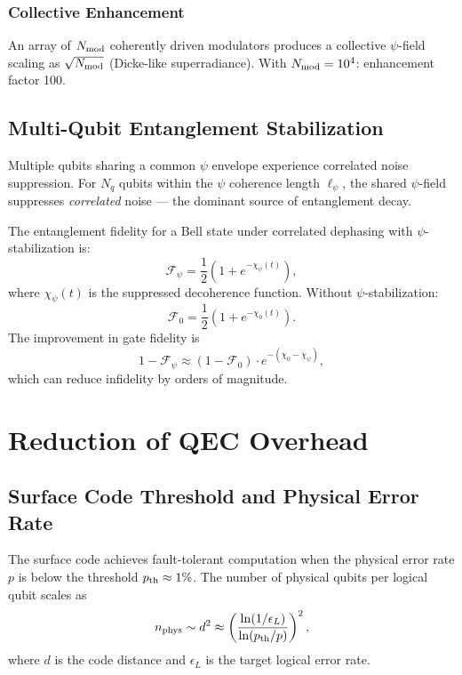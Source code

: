 \documentclass[aps,prd,twocolumn,superscriptaddress,nofootinbib]{revtex4-2}
\begin{document}
\subsubsection{Collective Enhancement}
An array of $N_{\rm mod}$ coherently driven modulators produces a
collective $\psi$-field scaling as $\sqrt{N_{\rm mod}}$ (Dicke-like
superradiance). With $N_{\rm mod} = 10^4$: enhancement factor 100.

\subsection{Multi-Qubit Entanglement Stabilization}

Multiple qubits sharing a common $\psi$ envelope experience correlated
noise suppression. For $N_q$ qubits within the $\psi$ coherence length
$\ell_\psi$, the shared $\psi$-field suppresses \emph{correlated} noise
--- the dominant source of entanglement decay.

The entanglement fidelity for a Bell state under correlated dephasing
with $\psi$-stabilization is:
\begin{equation}
\mathcal{F}_\psi = \frac{1}{2}\!\left(1 + e^{-\chi_\psi(t)}\right),
\end{equation}
where $\chi_\psi(t)$ is the suppressed decoherence function. Without
$\psi$-stabilization:
\begin{equation}
\mathcal{F}_0 = \frac{1}{2}\!\left(1 + e^{-\chi_0(t)}\right).
\end{equation}
The improvement in gate fidelity is
\begin{equation}
1 - \mathcal{F}_\psi \approx (1 - \mathcal{F}_0) \cdot e^{-(\chi_0 - \chi_\psi)},
\end{equation}
which can reduce infidelity by orders of magnitude.

\section{Reduction of QEC Overhead}\label{sec:qec}

\subsection{Surface Code Threshold and Physical Error Rate}

The surface code achieves fault-tolerant computation when the physical
error rate $p$ is below the threshold $p_{\rm th} \approx 1\%$. The
number of physical qubits per logical qubit scales as
\begin{equation}
n_{\rm phys} \sim d^2 \approx \left(\frac{\ln(1/\epsilon_L)}
{\ln(p_{\rm th}/p)}\right)^2,
\end{equation}
where $d$ is the code distance and $\epsilon_L$ is the target logical
error rate.
\end{document}
